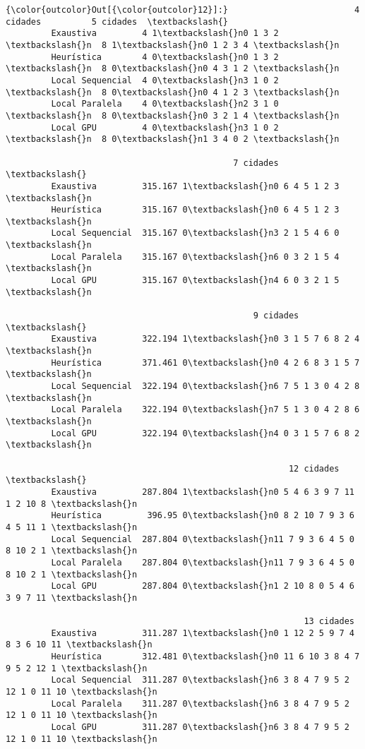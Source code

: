 \documentclass[11pt]{article}
\begin{document}
\begin{Verbatim}[commandchars=\\\{\}]
{\color{outcolor}Out[{\color{outcolor}12}]:}                         4 cidades          5 cidades  \textbackslash{}
         Exaustiva         4 1\textbackslash{}n0 1 3 2 \textbackslash{}n  8 1\textbackslash{}n0 1 2 3 4 \textbackslash{}n   
         Heurística        4 0\textbackslash{}n0 1 3 2 \textbackslash{}n  8 0\textbackslash{}n0 4 3 1 2 \textbackslash{}n   
         Local Sequencial  4 0\textbackslash{}n3 1 0 2 \textbackslash{}n  8 0\textbackslash{}n0 4 1 2 3 \textbackslash{}n   
         Local Paralela    4 0\textbackslash{}n2 3 1 0 \textbackslash{}n  8 0\textbackslash{}n0 3 2 1 4 \textbackslash{}n   
         Local GPU         4 0\textbackslash{}n3 1 0 2 \textbackslash{}n  8 0\textbackslash{}n1 3 4 0 2 \textbackslash{}n   
         
                                             7 cidades  \textbackslash{}
         Exaustiva         315.167 1\textbackslash{}n0 6 4 5 1 2 3 \textbackslash{}n   
         Heurística        315.167 0\textbackslash{}n0 6 4 5 1 2 3 \textbackslash{}n   
         Local Sequencial  315.167 0\textbackslash{}n3 2 1 5 4 6 0 \textbackslash{}n   
         Local Paralela    315.167 0\textbackslash{}n6 0 3 2 1 5 4 \textbackslash{}n   
         Local GPU         315.167 0\textbackslash{}n4 6 0 3 2 1 5 \textbackslash{}n   
         
                                                 9 cidades  \textbackslash{}
         Exaustiva         322.194 1\textbackslash{}n0 3 1 5 7 6 8 2 4 \textbackslash{}n   
         Heurística        371.461 0\textbackslash{}n0 4 2 6 8 3 1 5 7 \textbackslash{}n   
         Local Sequencial  322.194 0\textbackslash{}n6 7 5 1 3 0 4 2 8 \textbackslash{}n   
         Local Paralela    322.194 0\textbackslash{}n7 5 1 3 0 4 2 8 6 \textbackslash{}n   
         Local GPU         322.194 0\textbackslash{}n4 0 3 1 5 7 6 8 2 \textbackslash{}n   
         
                                                        12 cidades  \textbackslash{}
         Exaustiva         287.804 1\textbackslash{}n0 5 4 6 3 9 7 11 1 2 10 8 \textbackslash{}n   
         Heurística         396.95 0\textbackslash{}n0 8 2 10 7 9 3 6 4 5 11 1 \textbackslash{}n   
         Local Sequencial  287.804 0\textbackslash{}n11 7 9 3 6 4 5 0 8 10 2 1 \textbackslash{}n   
         Local Paralela    287.804 0\textbackslash{}n11 7 9 3 6 4 5 0 8 10 2 1 \textbackslash{}n   
         Local GPU         287.804 0\textbackslash{}n1 2 10 8 0 5 4 6 3 9 7 11 \textbackslash{}n   
         
                                                           13 cidades  
         Exaustiva         311.287 1\textbackslash{}n0 1 12 2 5 9 7 4 8 3 6 10 11 \textbackslash{}n  
         Heurística        312.481 0\textbackslash{}n0 11 6 10 3 8 4 7 9 5 2 12 1 \textbackslash{}n  
         Local Sequencial  311.287 0\textbackslash{}n6 3 8 4 7 9 5 2 12 1 0 11 10 \textbackslash{}n  
         Local Paralela    311.287 0\textbackslash{}n6 3 8 4 7 9 5 2 12 1 0 11 10 \textbackslash{}n  
         Local GPU         311.287 0\textbackslash{}n6 3 8 4 7 9 5 2 12 1 0 11 10 \textbackslash{}n  
\end{Verbatim}
            
\end{document}
